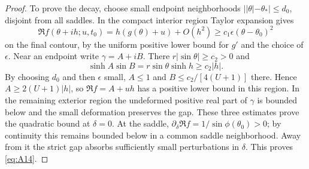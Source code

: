 \documentclass[11pt,a4paper]{article}
\numberwithin{equation}{section}
\theoremstyle{plain}
\theoremstyle{definition}
\begin{document}
\begin{proof}
To prove the decay, choose small endpoint neighborhoods $||\theta|-\theta_*|\le d_0$, disjoint from all saddles. In the compact interior region Taylor expansion gives
\[
\Re f(\theta+i h;u,t_0)=h(g(\theta)+u)+O(h^2)\ge c_1\epsilon(\theta-\theta_0)^2
\]
on the final contour, by the uniform positive lower bound for $g'$ and the choice of $\epsilon$. Near an endpoint write $\gamma=A+iB$. There $r|\sin\theta|\ge c_2>0$ and
\[
\sinh A\sin B=r\sin\theta\sinh h\ge c_2|h|.
\]
By choosing $d_0$ and then $\epsilon$ small, $A\le1$ and $B\le c_2/[4(U+1)]$ there. Hence $A\ge2(U+1)|h|$, so $\Re f=A+uh$ has a positive lower bound in this region. In the remaining exterior region the undeformed positive real part of $\gamma$ is bounded below and the small deformation preserves the gap. These three estimates prove the quadratic bound at $\delta=0$. At the saddle, $\partial_\delta\Re f=1/\sin\phi(\theta_0)>0$; by continuity this remains bounded below in a common saddle neighborhood. Away from it the strict gap absorbs sufficiently small perturbations in $\delta$. This proves \eqref{eq:A14}.
\end{proof}
\end{document}
